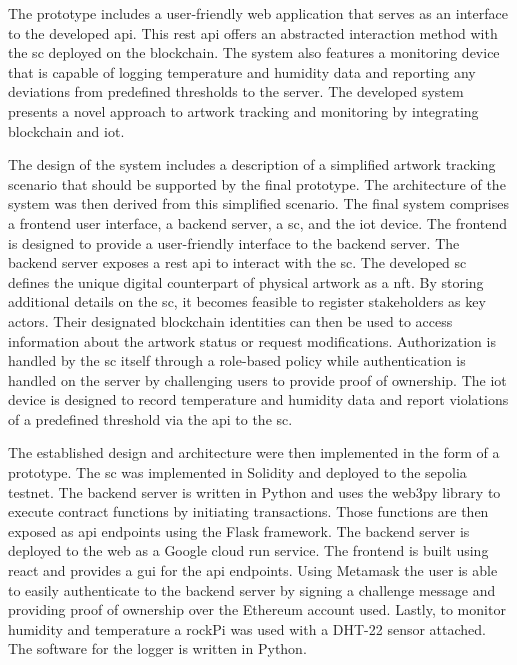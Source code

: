 The prototype includes a user-friendly web application that serves as an interface to the developed \gls{api}. This \gls{rest} \gls{api} offers an abstracted interaction method with the \gls{sc} deployed on the blockchain. The system also features a monitoring device that is capable of logging temperature and humidity data and reporting any deviations from predefined thresholds to the server. The developed system presents a novel approach to artwork tracking and monitoring by integrating blockchain and \gls{iot}.

The design of the system includes a description of a simplified artwork tracking scenario that should be supported by the final prototype. The architecture of the system was then derived from this simplified scenario. The final system comprises a frontend user interface, a backend server, a \gls{sc}, and the \gls{iot} device. The frontend is designed to provide a user-friendly interface to the backend server. The backend server exposes a \gls{rest} \gls{api} to interact with the \gls{sc}. The developed \gls{sc} defines the unique digital counterpart of physical artwork as a \gls{nft}. By storing additional details on the \gls{sc}, it becomes feasible to register stakeholders as key actors. Their designated blockchain identities can then be used to access information about the artwork status or request modifications. Authorization is handled by the \gls{sc} itself through a role-based policy while authentication is handled on the server by challenging users to provide proof of ownership. The \gls{iot} device is designed to record temperature and humidity data and report violations of a predefined threshold via the \gls{api} to the \gls{sc}.

The established design and architecture were then implemented in the form of a prototype. The \gls{sc} was implemented in Solidity and deployed to the sepolia testnet. The backend server is written in Python and uses the web3py library to execute contract functions by initiating transactions. Those functions are then exposed as \gls{api} endpoints using the Flask framework. The backend server is deployed to the web as a Google cloud run service. The frontend is built using react and provides a \gls{gui} for the \gls{api} endpoints. Using Metamask the user is able to easily authenticate to the backend server by signing a challenge message and providing proof of ownership over the Ethereum account used. Lastly, to monitor humidity and temperature a rockPi was used with a DHT-22 sensor attached. The software for the logger is written in Python. 

